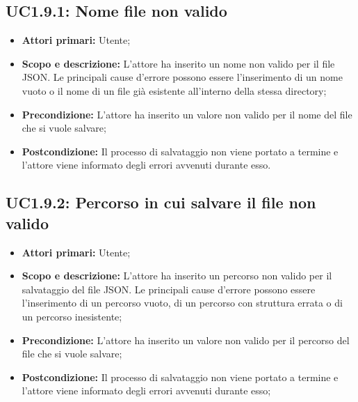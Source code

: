 \subsection{UC1.9.1: Nome file non valido} 
\begin{itemize} 
	\item{\textbf{Attori primari:} Utente;} 
	\item{\textbf{Scopo e descrizione:} L'attore ha inserito un nome non valido per il file JSON. Le principali cause d'errore possono essere l'inserimento di un nome vuoto o il nome di un file già esistente all'interno della stessa directory;} 
	\item{\textbf{Precondizione:} L'attore ha inserito un valore non valido per il nome del file che si vuole salvare;} 
	\item{\textbf{Postcondizione:} Il processo di salvataggio non viene portato a termine e l'attore viene informato degli errori avvenuti durante esso.} 
\end{itemize} 
\subsection{UC1.9.2: Percorso in cui salvare il file non valido} 
\begin{itemize} 
	\item{\textbf{Attori primari:} Utente;} 
	\item{\textbf{Scopo e descrizione:} L'attore ha inserito un percorso non valido per il salvataggio del file JSON. Le principali cause d'errore possono essere l'inserimento di un percorso vuoto, di un percorso con struttura errata o di un percorso inesistente;} 
	\item{\textbf{Precondizione:} L'attore ha inserito un valore non valido per il percorso del file che si vuole salvare;} 
	\item{\textbf{Postcondizione:} Il processo di salvataggio non viene portato a termine e l'attore viene informato degli errori avvenuti durante esso;} 
\end{itemize} 
